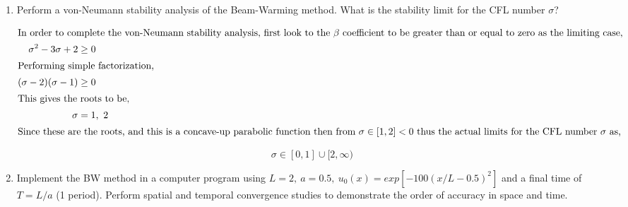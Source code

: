 \begin{enumerate}[label=\alph*., start = 1]
    \item Perform a von-Neumann stability analysis of the Beam-Warming method.  What is the stability limit for the CFL number $\sigma$?
    
    \vspace{-0.35in}
    \begin{align*}
        \shortintertext{In order to complete the von-Neumann stability analysis, first look to the $\beta$ coefficient to be greater than or equal to zero as the limiting case,}
        \sigma^2 - 3\sigma + 2 & \ge 0\\
        \shortintertext{Performing simple factorization,}
        (\sigma - 2 )(\sigma -1) & \ge 0\\
        \shortintertext{This gives the roots to be,}
        \sigma & = 1,\ 2\\
        \shortintertext{Since these are the roots, and this is a concave-up parabolic function then from $\sigma \in [1,2] < 0$ thus the actual limits for the CFL number $\sigma$ as,}
    \end{align*}

    \vspace{-0.5in}
    \begin{equation*}
        \boxed{\sigma \in [0,1] \cup [2, \infty)}
    \end{equation*}

    \item Implement the BW method in a computer program using $L= 2,\ a= 0.5,\ u_0(x) = exp[-100(x/L-0.5)^2]$ and a final time of $T=L/a$ (1 period).  Perform spatial and temporal convergence studies to demonstrate the order of accuracy in space and time.
\end{enumerate}